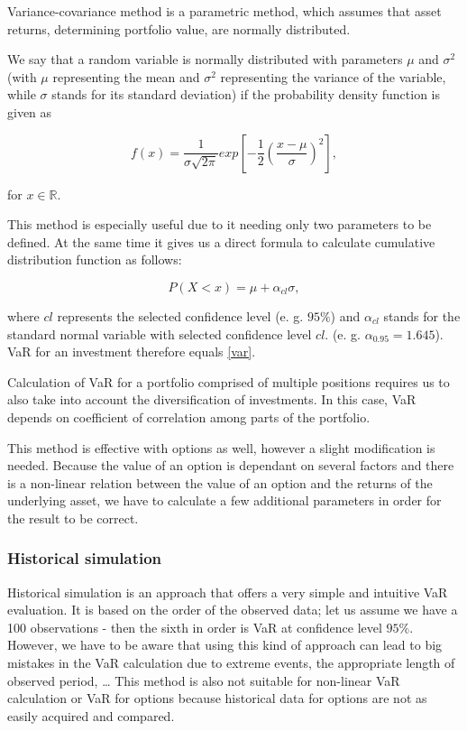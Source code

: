 \documentclass[a4paper, 12pt]{article}
\theoremstyle{definition}
\theoremstyle{plain}
\theoremstyle{definition}
\newcommand{\R}{\mathbb R}
\begin{document}
Variance-covariance method is a parametric method, which assumes that asset returns, determining portfolio value,
are normally distributed.

We say that a random variable is normally distributed with parameters $\mu$ and $\sigma^2$ 
(with $\mu$ representing the mean and $\sigma^2$ representing the variance of the variable,  
while $\sigma$ stands for its standard deviation) if the probability density function is given as
 
\begin{equation}
    f(x) = \frac{1}{\sigma\sqrt{2\pi}}exp[-\frac{1}{2}(\frac{x-\mu}{\sigma})^2],
\end{equation}

for $x\in \R$. 

This method is especially useful due to it needing only two parameters to be defined. 
At the same time it gives us a direct formula to calculate cumulative distribution function as follows:

\begin{equation}
    P(X<x) = \mu + \alpha_{cl}\sigma,
\end{equation}

where $cl$ represents the selected confidence level (e. g. $95\%$) and 
$\alpha_{cl}$ stands for the standard normal variable with selected confidence level $cl$.
(e. g. $\alpha_{0.95}=1.645$). 
VaR for an investment therefore equals \eqref{var}.

Calculation of VaR for a portfolio comprised of multiple positions 
requires us to also take into account the diversification of investments.
In this case, VaR depends on coefficient of correlation among parts of the portfolio.

This method is effective with options as well, however a slight modification is needed.
Because the value of an option is dependant on several factors and
there is a non-linear relation between the value of an option and 
the returns of the underlying asset, we have to calculate a few additional parameters in 
order for the result to be correct.


\subsubsection{Historical simulation}

Historical simulation is an approach that offers a very simple and intuitive VaR evaluation.
It is based on the order of the observed data;
let us assume we have a 100 observations - then the sixth in order is VaR at 
confidence level $95\%$.
However, we have to be aware that using this kind of approach can lead to 
big mistakes in the VaR calculation due to extreme events, the appropriate length of observed period, \dots
This method is also not suitable for non-linear VaR calculation or VaR for options
because historical data for options are not as easily acquired and compared.
\end{document}
